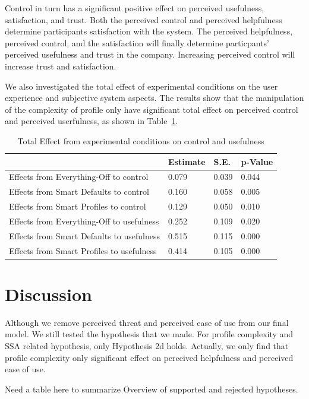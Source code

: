 Control in turn has a significant positive effect on perceived usefulness, satisfaction, and trust. Both the perceived control and perceived helpfulness determine participants satisfaction with the system. The perceived helpfulness, perceived control, and the satisfaction will finally determine particpants' perceived usefulness and trust in the company. Increasing perceived control will increase trust and satisfaction.

We also investigated the total effect of experimental conditions on the user experience and subjective system aspects. The results show that the manipulation of the complexity of profile only have significant total effect on perceived control and perceived userfulness, as shown in Table~\ref{tab:totaleffect}.

\begin{table}[]
	\begin{tabular}{l|l|l|l}
		\hline
		& Estimate & S.E.  & p-Value \\ \hline
		Effects from Everything-Off to control    & 0.079    & 0.039 & 0.044   \\\hline
		Effects from Smart Defaults to control    & 0.160    & 0.058 & 0.005   \\\hline
		Effects from Smart Profiles to control    & 0.129    & 0.050 & 0.010   \\\hline
		Effects from Everything-Off to usefulness & 0.252    & 0.109 & 0.020   \\\hline
		Effects from Smart Defaults to usefulness & 0.515    & 0.115 & 0.000   \\\hline
		Effects from Smart Profiles to usefulness & 0.414    & 0.105 & 0.000  \\\hline
	\end{tabular}
	\caption{Total Effect from experimental conditions on control and usefulness}\label{tab:totaleffect}
\end{table}

\section{Discussion}
Although we remove perceived threat and perceived ease of use from our final model. We still tested the hypothesis that we made. For profile complexity and SSA related hypothesis, only Hypothesis 2d holds. Actually, we only find that profile complexity only significant effect on perceived helpfulness and perceived ease of use.

Need a table here to summarize Overview of supported and rejected hypotheses.

